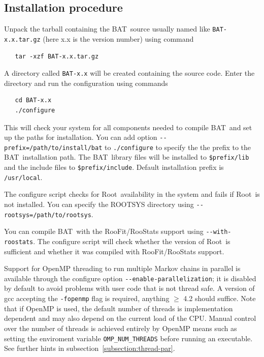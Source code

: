 \documentclass[11pt, a4paper]{article}
\newcommand{\bat}{{\sc BAT}}
\newcommand{\BAT}{\bat}
\newcommand{\Root}{{\sc Root}}
\begin{document}

\subsection{Installation procedure}

Unpack the tarball containing the \bat\ source usually named like
\verb|BAT-x.x.tar.gz| (here x.x is the version number) using command
%
\begin{verbatim}
   tar -xzf BAT-x.x.tar.gz
\end{verbatim}
%
A directory called \verb|BAT-x.x| will be created containing the source code.
Enter the directory and run the configuration using commands
%
\begin{verbatim}
   cd BAT-x.x
   ./configure
\end{verbatim}

This will check your system for all components needed to compile \bat\
and set up the paths for installation. You can add option
\verb|--prefix=/path/to/install/bat| to \verb|./configure| to specify
the the prefix to the \bat\ installation path. The \bat\ library files
will be installed to \verb|$prefix/lib| and the include files to
\verb|$prefix/include|. Default installation prefix is
\verb|/usr/local|.

The configure script checks for \Root\ availability in the system and
fails if \Root\ is not installed. You can specify the ROOTSYS directory
using \verb|--rootsys=/path/to/rootsys|.

You can compile \BAT\ with the RooFit/RooStats support using
\verb|--with-roostats|. The configure script will check whether the version of
\Root\ is sufficient and whether it was compiled with RooFit/RooStats
support.

Support for OpenMP threading to run multiple Markov chains in
parallel is available through the configure option
\verb|--enable-parallelization|; it is disabled by default to avoid
problems with user code that is not thread safe. A version of gcc
accepting the \verb|-fopenmp| flag is required, anything $\geq$ 4.2
should suffice.  Note that if OpenMP is used, the default
number of threads is implementation dependent and may also depend on
the current load of the CPU. Manual control over the number of threads
is achieved entirely by OpenMP means such as setting the
enviroment variable \verb|OMP_NUM_THREADS| before running an
executable. See further hints in
subsection~\ref{subsection:thread-par}.
\end{document}

